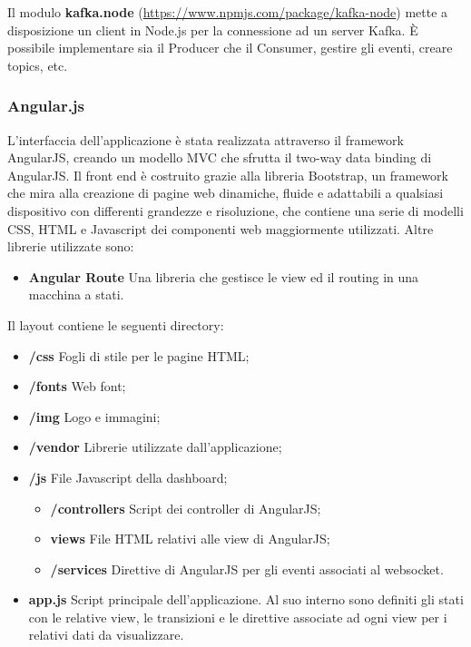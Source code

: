 \documentclass[12pt]{article}
\begin{document}
Il modulo \textbf{kafka.node} (\href{https://www.npmjs.com/package/kafka-node}{https://www.npmjs.com/package/kafka-node}) mette a disposizione un client in Node.js per la connessione ad un server Kafka. \`E possibile implementare sia il Producer che il Consumer, gestire gli eventi, creare topics, etc.

\subsubsection{Angular.js}

L'interfaccia dell'applicazione è stata realizzata attraverso il framework AngularJS, creando un modello MVC che sfrutta il two-way data binding di AngularJS. Il front end è costruito grazie alla libreria Bootstrap, un framework che mira alla creazione di pagine web dinamiche, fluide e adattabili a qualsiasi dispositivo con differenti grandezze e risoluzione, che contiene una serie di modelli CSS, HTML e Javascript dei componenti web maggiormente utilizzati. Altre librerie utilizzate sono: 
\begin{itemize}
	\item \textbf{Angular Route} Una libreria che gestisce le view ed il routing in una macchina a stati.
\end{itemize}

Il layout contiene le seguenti directory: 
\begin{itemize}
	\item \textbf{/css} Fogli di stile per le pagine HTML;
	\item \textbf{/fonts} Web font;
	\item \textbf{/img} Logo e immagini;
	\item \textbf{/vendor} Librerie utilizzate dall'applicazione;
	\item \textbf{/js} File Javascript della dashboard;
	\begin{itemize}
		\item \textbf{/controllers} Script dei controller di AngularJS;
		\item \textbf{views} File HTML relativi alle view di AngularJS;
		\item \textbf{/services} Direttive di AngularJS per gli eventi associati al websocket.
	\end{itemize}
	\item \textbf{app.js} Script principale dell'applicazione. Al suo interno sono definiti gli stati con le relative view, le transizioni e le direttive associate ad ogni view per i relativi dati da visualizzare.
\end{itemize}
\end{document}
